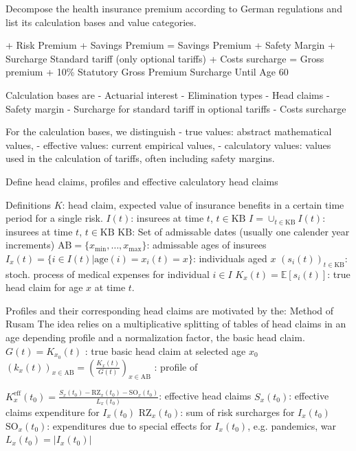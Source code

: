 \documentclass[11pt,a4paper,twoside]{article}
\begin{document}
Decompose the health insurance premium according to German regulations
and list its calculation bases and value categories.

+ Risk Premium
+ Savings Premium
= Savings Premium
+ Safety Margin
+ Surcharge Standard tariff (only optional tariffs)
+ Costs surcharge
= Gross premium
+ 10\% Statutory Gross Premium Surcharge Until Age 60

Calculation bases are
- Actuarial interest
- Elimination types
- Head claims
- Safety margin
- Surcharge for standard tariff in optional tariffs
- Costs surcharge

For the calculation bases, we distinguish
- true values: abstract mathematical values,
- effective values: current empirical values,
- calculatory values: values used in the calculation of tariffs, often including safety margins.

Define head claims, profiles and effective calculatory head claims


Definitions
\( K \): head claim, expected value of insurance benefits in a certain time period for a single risk.
\( I(t) \): insurees at time \( t \), \( t \in \text{KB} \)
\( I = \cup_{t \in \text{KB}} I(t) \): insurees at time \( t \), \( t \in \text{KB} \)
\( \text{KB} \): Set of admissable dates (usually one calender year increments)
\( \text{AB} = \{x_{\text{min}}, \dots, x_{\text{max}}\} \): admissable ages of insurees
\( I_{x}(t) = \{ i \in I(t)| \text{age}(i) = x_i(t) = x \} \): individuals aged \( x \)
\( (s_i(t))_{t \in \text{KB}} \): stoch. process of medical expenses for individual \( i \in I \)
\( K_x(t) = \mathbb{E}[s_i(t)] \): true head claim for age \( x \) at time \( t \).

Profiles and their corresponding head claims are motivated by the:
Method of Rusam
The idea relies on a multiplicative splitting of tables of head claims in an age depending profile and a
normalization factor, the basic head claim.
\( G(t) = K_{x_0}(t) \) : true basic head claim at selected age \( x_0 \)
\( (k_x(t))_{x \in \text{AB}} = \left(\frac{K_x(t)}{G(t)} \right)_{x \in \text{AB}} \) : profile of \(  \)

\( K_x^{\text{eff}}(t_0) = \frac{S_x(t_0) - \text{RZ}_x(t_0) - \text{SO}_{x}(t_0)}{L_x(t_0)} \): effective head claims
\( S_x(t_0) \): effective claims expenditure for \( I_x(t_0) \)
\( \text{RZ}_x(t_0) \): sum of risk surcharges for \( I_x(t_0) \)
\( \text{SO}_{x}(t_0) \): expenditures due to special effects for \( I_x(t_0) \), e.g. pandemics, war
\( L_x(t_0) = |I_x(t_0)| \)
\end{document}
